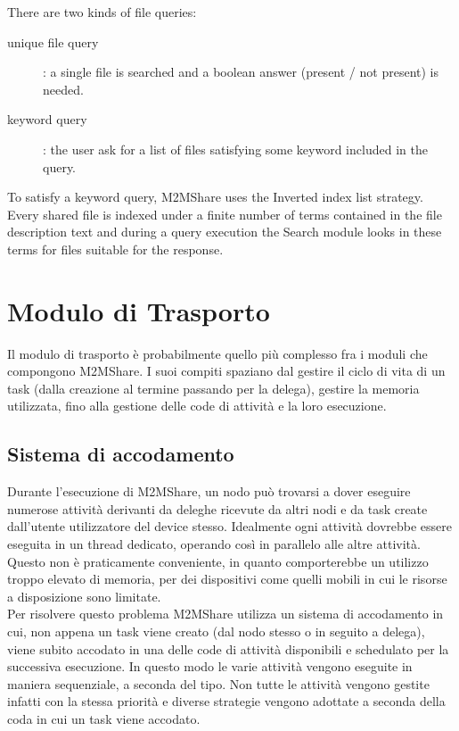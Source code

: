 There are two kinds of file queries: 

\begin{description}
\item[unique file query]: a single file is searched and a boolean answer (present / not present) is needed.
\item[keyword query]: the user ask for a list of files satisfying some keyword included in the query.
\end{description}

To satisfy a keyword query, M2MShare uses the Inverted index list strategy. Every shared file is indexed under a finite number of terms contained in the file description text and during a query execution the Search module looks in these terms for files suitable for the response.


\section{Modulo di Trasporto}
Il modulo di trasporto è probabilmente quello più complesso fra i moduli che compongono M2MShare. I suoi compiti spaziano dal gestire il ciclo di vita di un task (dalla creazione al termine passando per la delega), gestire la memoria utilizzata, fino alla gestione delle code di attività e la loro esecuzione.

\subsection{Sistema di accodamento}
Durante l'esecuzione di M2MShare, un nodo può trovarsi a dover eseguire numerose attività derivanti da deleghe ricevute da altri nodi e da task create dall'utente utilizzatore del device stesso. Idealmente ogni attività dovrebbe essere eseguita in un thread dedicato, operando così in parallelo alle altre attività. Questo non è praticamente conveniente, in quanto comporterebbe un utilizzo troppo elevato di memoria, per dei dispositivi come quelli mobili in cui le risorse a disposizione sono limitate. 
\\

Per risolvere questo problema M2MShare utilizza un sistema di accodamento in cui, non appena un task viene creato (dal nodo stesso o in seguito a delega), viene subito accodato in una delle code di attività disponibili e schedulato per la successiva esecuzione. In questo modo le varie attività vengono eseguite in maniera sequenziale, a seconda del tipo. Non tutte le attività vengono gestite infatti con la stessa priorità e diverse strategie vengono adottate a seconda della coda in cui un task viene accodato.
\\


